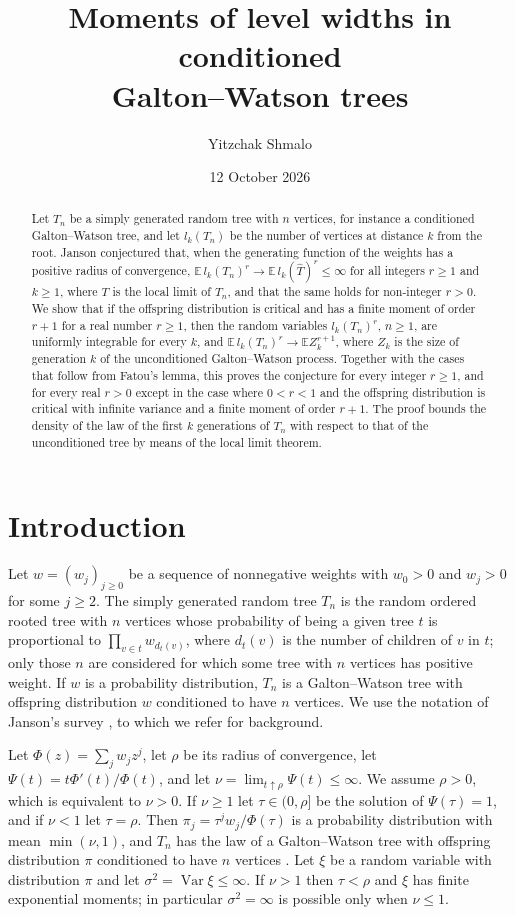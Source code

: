 \documentclass[11pt]{amsart}
\title[Moments of level widths]{Moments of level widths in conditioned\\ Galton--Watson trees}
\author{Yitzchak Shmalo}
\date{12 October 2026}
\theoremstyle{remark}
\numberwithin{equation}{section}
\newcommand{\E}{\mathbb E}
\newcommand{\hT}{\widehat T}
\begin{document}
\begin{abstract}
Let $T_n$ be a simply generated random tree with $n$ vertices, for instance a conditioned Galton--Watson tree, and let $l_k(T_n)$ be the number of vertices at distance $k$ from the root. Janson conjectured that, when the generating function of the weights has a positive radius of convergence, $\E\, l_k(T_n)^r\to\E\, l_k(\hT)^r\le\infty$ for all integers $r\ge1$ and $k\ge1$, where $\hT$ is the local limit of $T_n$, and that the same holds for non-integer $r>0$. We show that if the offspring distribution is critical and has a finite moment of order $r+1$ for a real number $r\ge1$, then the random variables $l_k(T_n)^r$, $n\ge1$, are uniformly integrable for every $k$, and $\E\, l_k(T_n)^r\to\E Z_k^{r+1}$, where $Z_k$ is the size of generation $k$ of the unconditioned Galton--Watson process. Together with the cases that follow from Fatou's lemma, this proves the conjecture for every integer $r\ge1$, and for every real $r>0$ except in the case where $0<r<1$ and the offspring distribution is critical with infinite variance and a finite moment of order $r+1$. The proof bounds the density of the law of the first $k$ generations of $T_n$ with respect to that of the unconditioned tree by means of the local limit theorem.
\end{abstract}
\maketitle

\section{Introduction}\label{sec:intro}

Let $w=(w_j)_{j\ge0}$ be a sequence of nonnegative weights with $w_0>0$ and $w_j>0$ for some $j\ge2$. The simply generated random tree $T_n$ is the random ordered rooted tree with $n$ vertices whose probability of being a given tree $t$ is proportional to $\prod_{v\in t}w_{d_t(v)}$, where $d_t(v)$ is the number of children of $v$ in $t$; only those $n$ are considered for which some tree with $n$ vertices has positive weight. If $w$ is a probability distribution, $T_n$ is a Galton--Watson tree with offspring distribution $w$ conditioned to have $n$ vertices. We use the notation of Janson's survey \cite{J12}, to which we refer for background.

Let $\Phi(z)=\sum_j w_jz^j$, let $\rho$ be its radius of convergence, let $\Psi(t)=t\Phi'(t)/\Phi(t)$, and let $\nu=\lim_{t\uparrow\rho}\Psi(t)\le\infty$. We assume $\rho>0$, which is equivalent to $\nu>0$. If $\nu\ge1$ let $\tau\in(0,\rho]$ be the solution of $\Psi(\tau)=1$, and if $\nu<1$ let $\tau=\rho$. Then $\pi_j=\tau^jw_j/\Phi(\tau)$ is a probability distribution with mean $\min(\nu,1)$, and $T_n$ has the law of a Galton--Watson tree with offspring distribution $\pi$ conditioned to have $n$ vertices \cite[Section~4]{J12}. Let $\xi$ be a random variable with distribution $\pi$ and let $\sigma^2=\operatorname{Var}\xi\le\infty$. If $\nu>1$ then $\tau<\rho$ and $\xi$ has finite exponential moments; in particular $\sigma^2=\infty$ is possible only when $\nu\le1$.
\end{document}

